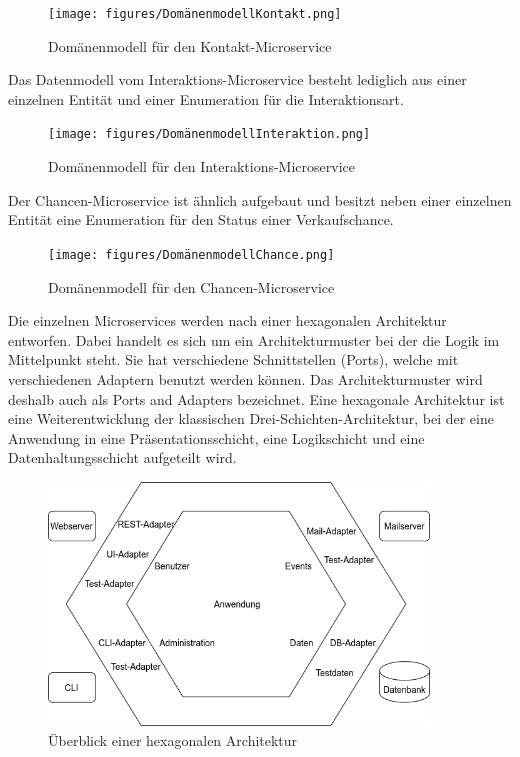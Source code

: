 \begin{figure}[H] 
    \centering
    \texttt{[image: figures/DomänenmodellKontakt.png]}
    \caption{Domänenmodell für den Kontakt-Microservice}
\end{figure} 

Das Datenmodell vom Interaktions-Microservice besteht lediglich aus einer einzelnen Entität und einer Enumeration für die Interaktionsart.

\begin{figure}[H] 
    \centering
    \texttt{[image: figures/DomänenmodellInteraktion.png]}
    \caption{Domänenmodell für den Interaktions-Microservice}
\end{figure}

Der Chancen-Microservice ist ähnlich aufgebaut und besitzt neben einer einzelnen Entität eine Enumeration für den Status einer Verkaufschance.

\begin{figure}[H] 
    \centering
    \texttt{[image: figures/DomänenmodellChance.png]}
    \caption{Domänenmodell für den Chancen-Microservice}
\end{figure}

Die einzelnen Microservices werden nach einer hexagonalen Architektur entworfen. Dabei handelt es sich um ein Architekturmuster bei der die Logik im Mittelpunkt steht. Sie hat verschiedene Schnittstellen (Ports), welche mit verschiedenen Adaptern benutzt werden können. Das Architekturmuster wird deshalb auch als Ports and Adapters bezeichnet. Eine hexagonale Architektur ist eine Weiterentwicklung der klassischen Drei-Schichten-Architektur, bei der eine Anwendung in eine Präsentationsschicht, eine Logikschicht und eine Datenhaltungsschicht aufgeteilt wird.

\begin{figure}[H] 
    \centering
    \includegraphics[width=0.9\textwidth]{figures/HexagonalDesignConcept.png}
    \caption{Überblick einer hexagonalen Architektur \parencite[vgl.][S. 204]{wolffMicroservices2018}}
\end{figure}

